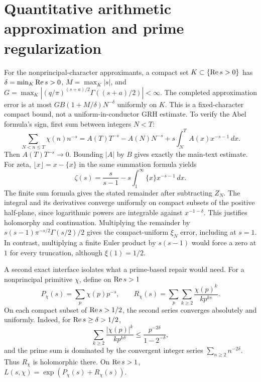 \section{Quantitative arithmetic approximation and prime regularization}
For the nonprincipal-character approximants, a compact set
$K\subset\{\operatorname{Re} s>0\}$ has
$\delta=\min_K\operatorname{Re} s>0$, $M=\max_K|s|$, and
$G=\max_K|(q/\pi)^{(s+a)/2}\Gamma((s+a)/2)|<\infty$.
The completed approximation error is at most
$GB(1+M/\delta)N^{-\delta}$ uniformly on $K$.
This is a fixed-character compact bound, not a uniform-in-conductor GRH estimate.
To verify the Abel formula's sign, first sum between integers $N<T$:
\[
 \sum_{N<n\le T}\chi(n)n^{-s}
 =A(T)T^{-s}-A(N)N^{-s}
   +s\int_N^T A(x)x^{-s-1}\,dx.
\]
Then $A(T)T^{-s}\to0$. Bounding $|A|$ by $B$ gives exactly the main-text estimate.
For zeta, $\lfloor x\rfloor=x-\{x\}$ in the same summation formula yields
\[
 \zeta(s)=\frac{s}{s-1}-s\int_1^\infty\{x\}x^{-s-1}\,dx.
\]
The finite sum formula gives the stated remainder after subtracting $Z_N$.
The integral and its derivatives converge uniformly on compact subsets
of the positive half-plane, since logarithmic powers are integrable
against $x^{-1-\delta}$. This justifies holomorphy and continuation.
Multiplying the remainder by $s(s-1)\pi^{-s/2}\Gamma(s/2)/2$
gives the compact-uniform $\xi_N$ error, including at $s=1$.
In contrast, multiplying a finite Euler product by $s(s-1)$ would force
a zero at $1$ for every truncation, although $\xi(1)=1/2$.

A second exact interface isolates what a prime-based repair would need.
For a nonprincipal primitive $\chi$, define on $\operatorname{Re} s>1$
\[
 P_\chi(s)=\sum_p\chi(p)p^{-s},\qquad
 R_\chi(s)=\sum_p\sum_{k\ge2}\frac{\chi(p)^k}{k p^{ks}}.
\]
On each compact subset of $\operatorname{Re} s>1/2$, the second series converges
absolutely and uniformly. Indeed, for $\operatorname{Re} s\ge\delta>1/2$,
\[
 \sum_{k\ge2}\frac{|\chi(p)|^k}{k p^{k\delta}}
 \le\frac{p^{-2\delta}}{1-2^{-\delta}},
\]
and the prime sum is dominated by the convergent integer series
$\sum_{n\ge2}n^{-2\delta}$. Thus $R_\chi$ is holomorphic there.
On $\operatorname{Re} s>1$, $L(s,\chi)=\exp(P_\chi(s)+R_\chi(s))$.

